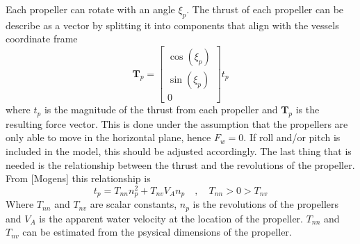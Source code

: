\documentclass[12pt,a4]{article}
\begin{document}
Each propeller can rotate with an angle $\xi_p$. The thrust of each propeller can be describe as a vector by splitting it into components that align with the vessels coordinate frame
\begin{equation}
	\bm{T}_p = \begin{bmatrix} \cos(\xi_p)\\ \sin(\xi_p)\\ 0 \end{bmatrix} t_p
\end{equation}
where $t_p$ is the magnitude of the thrust from each propeller and $\bm{T}_p$ is the resulting force vector. This is done under the assumption that the propellers are only able to move in the horizontal plane, hence $F_w = 0$. If roll and/or pitch is included in the model, this should be adjusted accordingly.
The last thing that is needed is the relationship between the thrust and the revolutions of the propeller. From [Mogens] this relationship is
\begin{equation}\label{eq:CA_thrust}
	t_p = T_{nn}n_p^2+T_{nv}V_A n_p \quad,\quad T_{nn} > 0 > T_{nv}
\end{equation}
Where $T_{nn}$ and $T_{nv}$ are scalar constants, $n_p$ is the revolutions of the propellers and $V_A$ is the apparent water velocity at the location of the propeller.
$T_{nn}$ and $T_{nv}$ can be estimated from the psysical dimensions of the propeller.
\end{document}
